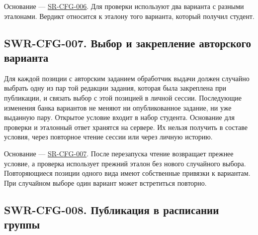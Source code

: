 \documentclass[12pt,a4paper]{article}
\begin{document}
Основание --- {\href{../04\_Системные\_требования/DOC-05\_Системные\_требования.pdf\#sr-cfg-006}{SR-CFG-006}}. Для проверки используют два варианта с разными эталонами. Вердикт относится к эталону того варианта, который получил студент.

\subsection{SWR-CFG-007. Выбор и закрепление авторского варианта}\label{swr-cfg-007-ux432ux44bux431ux43eux440-ux438-ux437ux430ux43aux440ux435ux43fux43bux435ux43dux438ux435-ux430ux432ux442ux43eux440ux441ux43aux43eux433ux43e-ux432ux430ux440ux438ux430ux43dux442ux430}

\hypertarget{swr-cfg-007-выбор-и-закрепление-авторского-варианта}{}

\hypertarget{swr-cfg-007}{}

Для каждой позиции с авторским заданием обработчик выдачи должен случайно выбрать одну из пар той редакции задания, которая была закреплена при публикации, и связать выбор с этой позицией в личной сессии. Последующие изменения банка вариантов не меняют ни опубликованное задание, ни уже выданную пару. Открытое условие входит в набор студента. Основание для проверки и эталонный ответ хранятся на сервере. Их нельзя получить в составе условия, через повторное чтение сессии или через личную историю.

Основание --- {\href{../04\_Системные\_требования/DOC-05\_Системные\_требования.pdf\#sr-cfg-007}{SR-CFG-007}}. После перезапуска чтение возвращает прежнее условие, а проверка использует прежний эталон без нового случайного выбора. Повторяющиеся позиции одного вида имеют собственные привязки к вариантам. При случайном выборе один вариант может встретиться повторно.

\subsection{SWR-CFG-008. Публикация в расписании группы}\label{swr-cfg-008-ux43fux443ux431ux43bux438ux43aux430ux446ux438ux44f-ux432-ux440ux430ux441ux43fux438ux441ux430ux43dux438ux438-ux433ux440ux443ux43fux43fux44b}

\hypertarget{swr-cfg-008-публикация-в-расписании-группы}{}

\hypertarget{swr-cfg-008}{}
\end{document}
